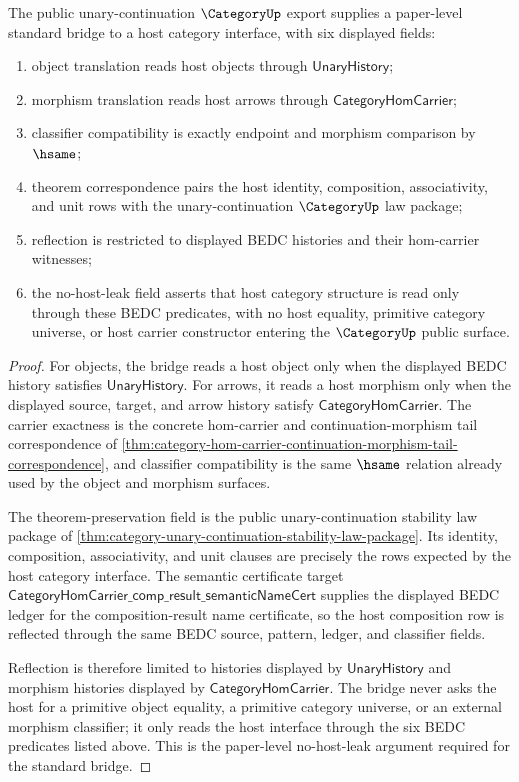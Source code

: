 \begin{theorem}
\label{thm:category-standard-unary-continuation-bridge}
The public unary-continuation $\CategoryUp$ export supplies a paper-level
standard bridge to a host category interface, with six displayed fields:
\begin{enumerate}
  \item object translation reads host objects through
  $\mathsf{UnaryHistory}$;
  \item morphism translation reads host arrows through
  $\mathsf{CategoryHomCarrier}$;
  \item classifier compatibility is exactly endpoint and morphism comparison
  by $\hsame$;
  \item theorem correspondence pairs the host identity, composition,
  associativity, and unit rows with the unary-continuation $\CategoryUp$ law
  package;
  \item reflection is restricted to displayed BEDC histories and their
  hom-carrier witnesses;
  \item the no-host-leak field asserts that host category structure is read
  only through these BEDC predicates, with no host equality, primitive category
  universe, or host carrier constructor entering the $\CategoryUp$ public
  surface.
\end{enumerate}
\end{theorem}
\begin{proof}
For objects, the bridge reads a host object only when the displayed BEDC
history satisfies $\mathsf{UnaryHistory}$. For arrows, it reads a host morphism
only when the displayed source, target, and arrow history satisfy
$\mathsf{CategoryHomCarrier}$. The carrier exactness is the concrete
hom-carrier and continuation-morphism tail correspondence of
\autoref{thm:category-hom-carrier-continuation-morphism-tail-correspondence},
and classifier compatibility is the same $\hsame$ relation already used by the
object and morphism surfaces.

The theorem-preservation field is the public unary-continuation stability law
package of \autoref{thm:category-unary-continuation-stability-law-package}.
Its identity, composition, associativity, and unit clauses are precisely the
rows expected by the host category interface. The semantic certificate target
$\mathsf{CategoryHomCarrier\_comp\_result\_semanticNameCert}$ supplies the
displayed BEDC ledger for the composition-result name certificate, so the host
composition row is reflected through the same BEDC source, pattern, ledger,
and classifier fields.

Reflection is therefore limited to histories displayed by
$\mathsf{UnaryHistory}$ and morphism histories displayed by
$\mathsf{CategoryHomCarrier}$. The bridge never asks the host for a primitive
object equality, a primitive category universe, or an external morphism
classifier; it only reads the host interface through the six BEDC predicates
listed above. This is the paper-level no-host-leak argument required for the
standard bridge.
\end{proof}

